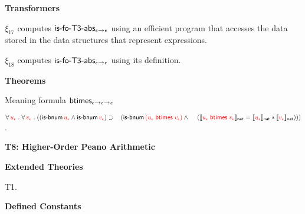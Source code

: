 \documentclass[fleqn,11pt]{article}
\begin{document}
  \item[] \textbf{Transformers}

  \be

    \setcounter{enumi}{16}

    \item $\xi_{17}$ computes $\mbox{\sf is-fo-T3-abs}_{\epsilon \rightarrow
      \epsilon}$ using an efficient program that accesses the data
      stored in the data structures that represent expressions.

    \item $\xi_{18}$ computes $\mbox{\sf is-fo-T3-abs}_{\epsilon \rightarrow
      \epsilon}$ using its definition.

  \ee

  \item[] \textbf{Theorems}

  \be

    \setcounter{enumi}{3}

    \item Meaning formula
    $\mbox{\sf btimes}_{\epsilon \rightarrow \epsilon \rightarrow \epsilon}$

    $\forall\, \textcolor{red}{u_\epsilon} \mathrel. \forall\, \textcolor{red}{v_\epsilon} \mathrel.
    ((\mbox{\sf is-bnum} \, \textcolor{red}{u_\epsilon} \wedge \mbox{\sf is-bnum} \, \textcolor{red}{v_\epsilon}) 
    \supset {}\\
    \hspace*{2ex}(\mbox{\sf is-bnum} \, 
    \textcolor{red}{(u_\epsilon \; \mbox{\sf btimes} \; v_\epsilon)} \wedge {}\\
    \hspace*{2.8ex}(\llbracket\textcolor{red}{u_\epsilon \; \mbox{\sf btimes} \; 
    v_\epsilon}\rrbracket_{\sf nat} = 
    \llbracket\textcolor{red}{u_\epsilon}\rrbracket_{\sf nat} * \llbracket\textcolor{red}{v_\epsilon}\rrbracket_{\sf nat})))$.

  \ee

\ei

\noindent
\textbf{T8: Higher-Order Peano Arithmetic}

\bi

  \item[] \textbf{Extended Theories} 

  \be

    \setcounter{enumi}{0}

    \item T1.

  \ee

  \item[] \textbf{Defined Constants}

  \be

    \setcounter{enumi}{8}
\end{document}
